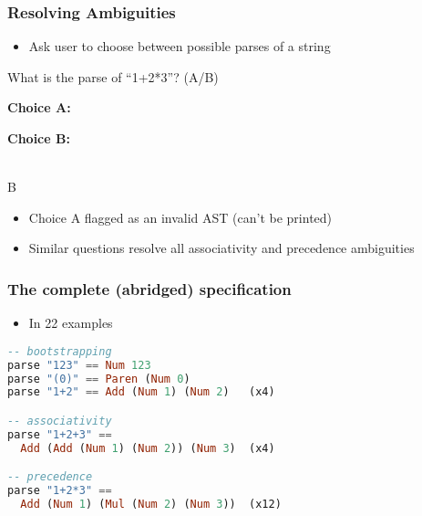 \begin{frame}[fragile]
\frametitle{Resolving Ambiguities}

\begin{itemize}
\item Ask user to choose between possible parses of a string
\end{itemize}

\vspace{5mm}

\Q What is the parse of ``1+2*3''? \hspace{2mm} (A/B)

\hspace{6mm}\begin{minipage}{.4\textwidth}
{\bf Choice A:}\\
\end{minipage}
\hspace{5mm}
\begin{minipage}{.4\textwidth}
{\bf Choice B:}\\
\end{minipage}
\\
\A B
\vspace{2mm}

\begin{itemize}
\item{Choice A flagged as an invalid AST (can't be printed)}
\item{Similar questions resolve all associativity and precedence
    ambiguities}
\end{itemize}
\end{frame}

\begin{frame}[fragile]
\frametitle{The complete {\small(abridged)} specification}

\begin{itemize}
\item{In 22 examples}
\end{itemize}

\begin{lstlisting}[mathescape,language=haskell]
-- bootstrapping
parse "123" == Num 123
parse "(0)" == Paren (Num 0)
parse "1+2" == Add (Num 1) (Num 2)   (x4)

-- associativity
parse "1+2+3" == 
  Add (Add (Num 1) (Num 2)) (Num 3)  (x4)

-- precedence
parse "1+2*3" == 
  Add (Num 1) (Mul (Num 2) (Num 3))  (x12)
\end{lstlisting}

\end{frame}